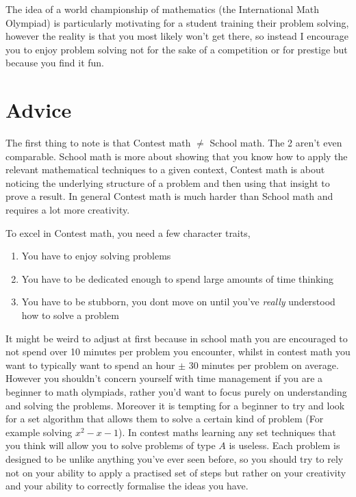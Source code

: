 \documentclass{article}
\begin{document}
The idea of a world championship of mathematics (the International Math Olympiad) is particularly motivating for a student training their problem solving, however the
reality is that you most likely won't get there, so instead I encourage you to enjoy problem solving not for the sake of a competition or for prestige but because you
find it fun.

\newpage

\section{Advice}

The first thing to note is that Contest math $\neq$ School math. The 2 aren't even comparable. School math is more about showing
that you know how to apply the relevant mathematical techniques to a given context, Contest math is about noticing the underlying structure of a problem and then using
that insight to prove a result. In general Contest math is much harder than School math and requires a lot more creativity. \vspace{0.2cm}

To excel in Contest math, you need a few character traits,

\begin{enumerate}
\item You have to enjoy solving problems
\item You have to be dedicated enough to spend large amounts of time thinking
\item You have to be stubborn, you dont move on until you've \textit{really} understood how to solve a problem
\end{enumerate}

It might be weird to adjust at first because in school math you are encouraged to not spend over 10 minutes per problem you encounter, whilst in contest math you want to
typically want to spend an hour $\pm$ 30 minutes per problem on average. However you shouldn't concern yourself with time management if you are a beginner to math
olympiads, rather you'd want to focus purely on understanding and solving the problems. Moreover it is tempting for a beginner to try and look for a set algorithm that
allows them to solve a certain kind of problem (For example solving $x^2 - x - 1$). In contest maths learning any set techniques that you think will allow you to solve
problems of type $A$ is useless. Each problem is designed to be unlike anything you've ever seen before, so you should try to rely not on your ability to apply a
practised set of steps but rather on your creativity and your ability to correctly formalise the ideas you have. \vspace{0.2cm}
\end{document}
